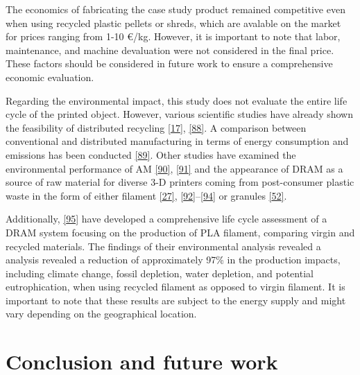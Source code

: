 \documentclass[
]{article}
\begin{document}
The economics of fabricating the case study product remained competitive
even when using recycled plastic pellets or shreds, which are avalable
on the market for prices ranging from 1-10 €/kg. However, it is
important to note that labor, maintenance, and machine devaluation were
not considered in the final price. These factors should be considered in
future work to ensure a comprehensive economic evaluation.

Regarding the environmental impact, this study does not evaluate the
entire life cycle of the printed object. However, various scientific
studies have already shown the feasibility of distributed recycling
\protect\hyperlink{ref-santander2020}{{[}17{]}},
\protect\hyperlink{ref-kerdlap2022}{{[}88{]}}. A comparison between
conventional and distributed manufacturing in terms of energy
consumption and emissions has been conducted
\protect\hyperlink{ref-Kreiger2013}{{[}89{]}}. Other studies have
examined the environmental performance of AM
\protect\hyperlink{ref-garcia2018}{{[}90{]}},
\protect\hyperlink{ref-colorado2020a}{{[}91{]}} and the appearance of
DRAM as a source of raw material for diverse 3-D printers coming from
post-consumer plastic waste in the form of either filament
\protect\hyperlink{ref-mohammed2017a}{{[}27{]}},
\protect\hyperlink{ref-hart2018}{{[}92{]}}--\protect\hyperlink{ref-mikula2021}{{[}94{]}}
or granules \protect\hyperlink{ref-alexandre2020}{{[}52{]}}.

Additionally, \protect\hyperlink{ref-caceres-mendoza2023}{{[}95{]}} have
developed a comprehensive life cycle assessment of a DRAM system
focusing on the production of PLA filament, comparing virgin and
recycled materials. The findings of their environmental analysis
revealed a analysis revealed a reduction of approximately 97\% in the
production impacts, including climate change, fossil depletion, water
depletion, and potential eutrophication, when using recycled filament as
opposed to virgin filament. It is important to note that these results
are subject to the energy supply and might vary depending on the
geographical location.

\hypertarget{conclusion-and-future-work}{%
\section{Conclusion and future work}\label{conclusion-and-future-work}}
\end{document}
